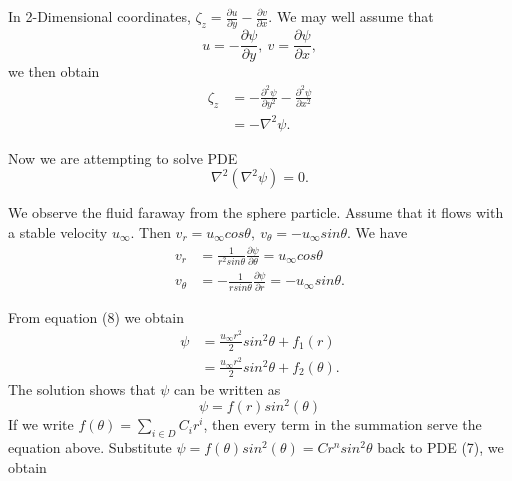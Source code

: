 \documentclass{report}
\begin{document}
\indent \par
\noindent
In 2-Dimensional coordinates, $\zeta_{z} = \frac{\partial u}{\partial y} - \frac{\partial v}{\partial x}$. We may well assume that 
\begin{equation}
u = -\frac{\partial \psi}{\partial y }, ~
v = \frac{\partial \psi}{\partial x},
\end{equation}
we then obtain
\begin{equation}
\begin{aligned}
    \zeta_{z} &= -\frac{\partial^2 \psi}{\partial y^2} - \frac{\partial^2 \psi}{\partial x^2} \\ & = -\nabla^2 \psi.
\end{aligned}
\end{equation}
\indent \par
\noindent
Now we are attempting to solve PDE
\begin{equation}
    \nabla^2(\nabla^2 \psi) = 0.
\end{equation}
\indent \par
We observe the fluid faraway from the sphere particle. Assume that it flows with a stable velocity $u_{\infty}$. Then $v_{r} = u_{\infty} cos\theta ,~ v_{\theta} = -u_{\infty} sin\theta$. We have
\begin{equation}
\begin{aligned}
    v_{r} &= \frac{1}{r^2 sin\theta} \frac{\partial \psi}{\partial \theta} = u_{\infty}cos\theta \\
    v_{\theta} &= -\frac{1}{r sin\theta} \frac{\partial \psi}{\partial r} = -u_{\infty}sin\theta.
\end{aligned}
\end{equation}
\indent \par
\noindent
From equation (8) we obtain
\begin{equation}
\begin{aligned}
    \psi &= \frac{u_{\infty} r^2}{2}sin^2\theta + f_{1}(r) \\
    & = \frac{u_{\infty} r^2 }{2} sin^2\theta + f_{2}(\theta).
\end{aligned}
\end{equation}
\indent The solution shows that $\psi$ can be written as 
\begin{equation}
    \psi = f(r)sin^2(\theta)
\end{equation}
If we write $f(\theta) = \sum_{i \in D} C_{i}r^{i}$, then every term in the summation serve the equation above.
Substitute $\psi =f(\theta)sin^2(\theta) = Cr^{n}sin^2\theta$ back to PDE (7), we obtain
\end{document}
